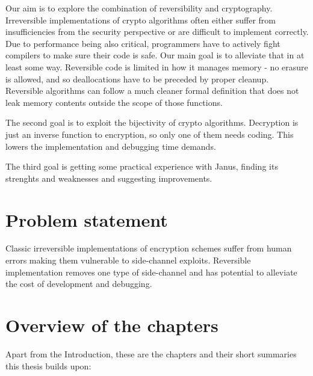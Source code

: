 \documentclass[a4paper,10pt,openright]{memoir}
\begin{document}
Our aim is to explore the combination of reversibility and 
cryptography. Irreversible implementations of crypto algorithms often 
either suffer from insufficiencies from the security perspective or are 
difficult to implement correctly. Due to performance being also 
critical, programmers have to actively fight compilers to make sure 
their code is safe. Our main goal is to alleviate that in at least some 
way. Reversible code is limited in how it manages memory - no erasure 
is allowed, and so deallocations have to be preceded by proper 
cleanup. Reversible algorithms can follow a much cleaner formal 
definition that does not leak memory contents outside the scope of 
those functions.

The second goal is to exploit the bijectivity of crypto algorithms. 
Decryption is just an inverse function to encryption, so only one of them 
needs coding. This lowers the implementation and debugging time demands.

The third goal is getting some practical experience with Janus, finding 
its strenghts and weaknesses and suggesting improvements.

\section{Problem statement}

Classic irreversible implementations of encryption schemes suffer from 
human errors making them vulnerable to side-channel exploits. 
Reversible implementation removes one type of side-channel and has 
potential to alleviate the cost of development and debugging.

\section{Overview of the chapters}

Apart from the Introduction, these are the chapters and their short 
summaries this thesis builds upon:
\end{document}
